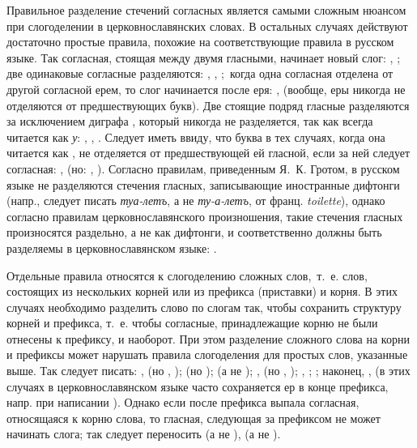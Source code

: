 \documentclass[12pt,a4paper,oneside]{extarticle}
\begin{document}
Правильное разделение стечений согласных является самыми сложным нюансом при слогоделении в церковнославянских словах. В остальных случаях действуют достаточно простые правила, похожие на соответствующие правила в русском языке. Так согласная, стоящая между двумя гласными, начинает новый слог: , ; две одинаковые согласные разделяются: , , ; когда одна согласная отделена от другой согласной ерем, то слог начинается после еря: ,  (вообще, еры никогда не отделяются от предшествующих букв). Две стоящие подряд гласные разделяются за исключением диграфа , который никогда не разделяется, так как всегда читается как \emph{у}: , , . Следует иметь ввиду, что буква  в тех случаях, когда она читается как , не отделяется от предшествующей ей гласной, если за ней следует согласная: ,  (но: , ). Согласно правилам, приведенным Я.~К. Гротом, в русском языке не разделяются стечения гласных, записывающие иностранные дифтонги (напр., следует писать \emph{туа-летъ}, а не \emph{ту-а-летъ}, от франц. \emph{toilette}), однако согласно правилам церковнославянского произношения, такие стечения гласных произносятся раздельно, а не как дифтонги, и соответственно должны быть разделяемы в церковнославянском языке: .

Отдельные правила относятся к слогоделению сложных слов, т.~е. слов, состоящих из нескольких корней или из префикса (приставки) и корня. В этих случаях необходимо разделить слово по слогам так, чтобы сохранить структуру корней и префикса, т.~е. чтобы согласные, принадлежащие корню не были отнесены к префиксу, и наоборот. При этом разделение сложного слова на корни и префиксы может нарушать правила слогоделения для простых слов, указанные выше. Так следует писать: ,  (но , );  (но );  (а не ); ,  (но  , ); , ; ; наконец, ,  (в этих случаях в церковнославянском языке часто сохраняется ер в конце префикса, напр. при написании ). Однако если после префикса выпала согласная, относящаяся к корню слова, то гласная, следующая за префиксом не может начинать слога; так следует переносить  (а не ),  (а не ).
\end{document}
